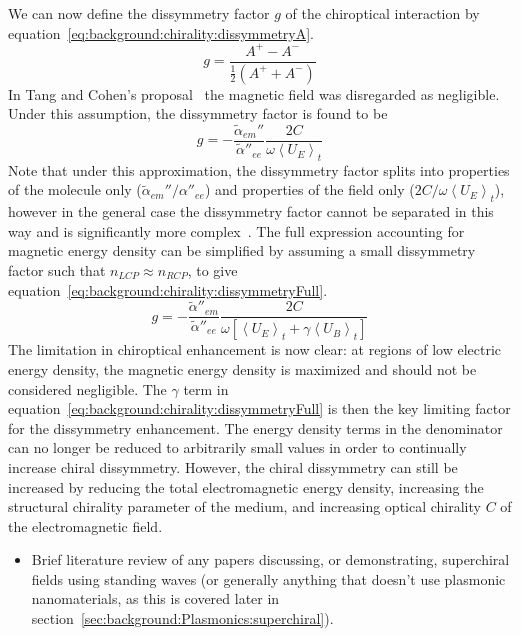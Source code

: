 We can now define the dissymmetry factor $g$ of the chiroptical interaction by equation~\ref{eq:background:chirality:dissymmetryA}.
\begin{equation}\label{eq:background:chirality:dissymmetryA}
    g = \frac{{{A^ + } - {A^ - }}}{\frac{1}{2}({A^ + } + {A^ - })}
\end{equation}
In Tang and Cohen's proposal~\cite{Tang2010} the magnetic field was disregarded as negligible. Under this assumption, the dissymmetry factor is found to be 
\begin{equation}\label{eq:background:chirality:dissymmetryG}
    g =  - \frac{{{\tilde \alpha }_{em}''}}{{\tilde \alpha ''}_{ee}}\frac{{2C}}{{\omega {{\left\langle {{U_E}} \right\rangle }_t}}}
\end{equation}
Note that under this approximation, the dissymmetry factor splits into properties of the molecule only (${{\tilde \alpha }_{em}''}/{{\alpha }''}_{ee}$) and properties of the field only (${2C}/{\omega {{\left\langle {{U}_{E}} \right\rangle }_{t}}}$), however in the general case the dissymmetry factor cannot be separated in this way and is significantly more complex~\cite{Choi2012}.
The full expression accounting for magnetic energy density can be simplified by assuming a small dissymmetry factor such that $n_{LCP} \approx n_{RCP}$, to give equation~\ref{eq:background:chirality:dissymmetryFull}.~\cite{Choi2012}
\begin{equation}\label{eq:background:chirality:dissymmetryFull}
    g =  - \frac{{\tilde \alpha ''}_{em}}{{{\tilde \alpha ''}_{ee}}}\frac{{2C}}{{\omega [{{\left\langle {{U_E}} \right\rangle }_t} + \gamma {{\left\langle {{U_B}} \right\rangle }_t}]}}
\end{equation}
The limitation in chiroptical enhancement is now clear: at regions of low electric energy density, the magnetic energy density is maximized and should not be considered negligible. The $\gamma$ term in equation~\ref{eq:background:chirality:dissymmetryFull} is then the key limiting factor for the dissymmetry enhancement. The energy density terms in the denominator can no longer be reduced to arbitrarily small values in order to continually increase chiral dissymmetry. However, the chiral dissymmetry can still be increased by reducing the total electromagnetic energy density, increasing the structural chirality parameter of the medium, and increasing optical chirality $C$ of the electromagnetic field. 

\begin{itemize}
    \item Brief literature review of any papers discussing, or demonstrating, superchiral fields using standing waves (or generally anything that doesn't use plasmonic nanomaterials, as this is covered later in section~\ref{sec:background:Plasmonics:superchiral}).
\end{itemize}
